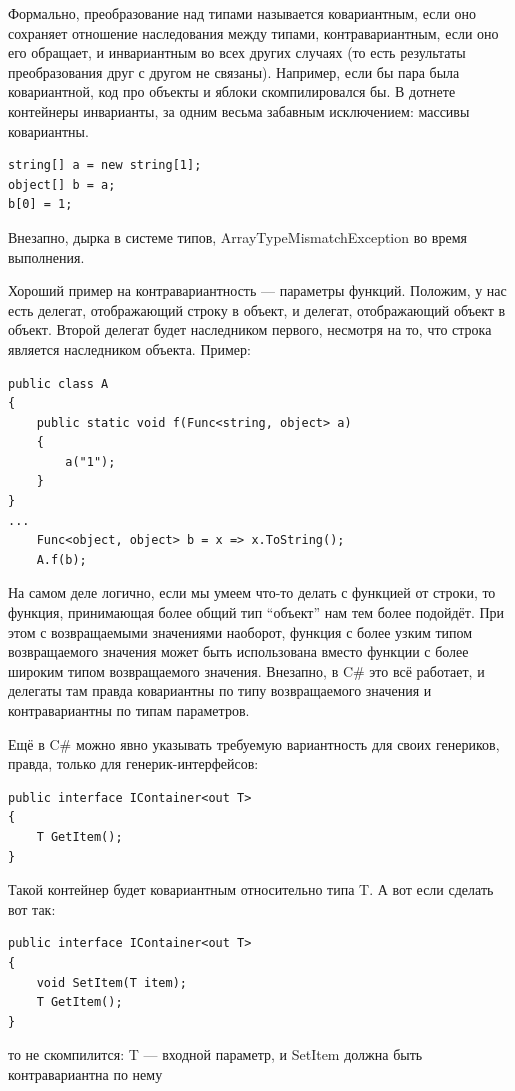 \documentclass[a5paper]{article}
\begin{document}
Формально, преобразование над типами называется ковариантным, если оно сохраняет отношение наследования между типами, контравариантным, если оно его обращает, и инвариантным во всех других случаях (то есть результаты преобразования друг с другом не связаны). Например, если бы пара была ковариантной, код про объекты и яблоки скомпилировался бы. В дотнете контейнеры инварианты, за одним весьма забавным исключением: массивы ковариантны.

\begin{verbatim}
string[] a = new string[1];
object[] b = a;
b[0] = 1;
\end{verbatim}

Внезапно, дырка в системе типов, ArrayTypeMismatchException во время выполнения.

Хороший пример на контравариантность --- параметры функций. Положим, у нас есть делегат, отображающий строку в объект, и делегат, отображающий объект в объект. Второй делегат будет наследником первого, несмотря на то, что строка является наследником объекта. Пример:

\begin{verbatim}
public class A
{
    public static void f(Func<string, object> a)
    {
        a("1");
    }
}
...
    Func<object, object> b = x => x.ToString();
    A.f(b);
\end{verbatim}

На самом деле логично, если мы умеем что-то делать с функцией от строки, то функция, принимающая более общий тип ``объект'' нам тем более подойдёт. При этом с возвращаемыми значениями наоборот, функция с более узким типом возвращаемого значения может быть использована вместо функции с более широким типом возвращаемого значения. Внезапно, в C\# это всё работает, и делегаты там правда ковариантны по типу возвращаемого значения и контравариантны по типам параметров.

Ещё в C\# можно явно указывать требуемую вариантность для своих генериков, правда, только для генерик-интерфейсов:

\begin{verbatim}
public interface IContainer<out T>
{
    T GetItem();
}
\end{verbatim}

Такой контейнер будет ковариантным относительно типа T. А вот если сделать вот так:

\begin{verbatim}
public interface IContainer<out T>
{
    void SetItem(T item);
    T GetItem();
}
\end{verbatim}

то не скомпилится: T --- входной параметр, и SetItem должна быть контравариантна по нему
\end{document}
